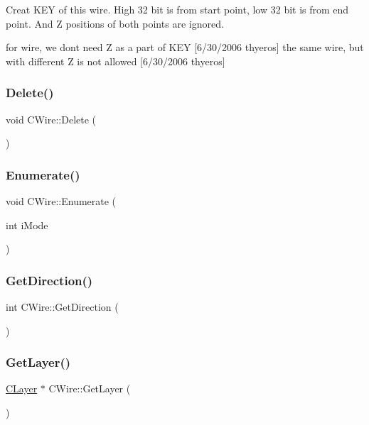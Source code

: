 Creat K\+EY of this wire. High 32 bit is from start point, low 32 bit is from end point. And Z positions of both points are ignored.

for wire, we don\textquotesingle{}t need Z as a part of K\+EY \mbox{[}6/30/2006 thyeros\mbox{]} the same wire, but with different Z is not allowed \mbox{[}6/30/2006 thyeros\mbox{]} \mbox{\label{classCWire_abbcbc22230d8e5a87ac4de9cbf990022}} 
\subsubsection{\texorpdfstring{Delete()}{Delete()}}
{\footnotesize\ttfamily void C\+Wire\+::\+Delete (\begin{DoxyParamCaption}{ }\end{DoxyParamCaption})}

\mbox{\label{classCWire_aa9ee88d6fd7117d3029c5a910c7957af}} 
\subsubsection{\texorpdfstring{Enumerate()}{Enumerate()}}
{\footnotesize\ttfamily void C\+Wire\+::\+Enumerate (\begin{DoxyParamCaption}\item[{int}]{i\+Mode }\end{DoxyParamCaption})}

\mbox{\label{classCWire_a737e918e2752d29ef32db9bc4648cb90}} 
\subsubsection{\texorpdfstring{GetDirection()}{GetDirection()}}
{\footnotesize\ttfamily int C\+Wire\+::\+Get\+Direction (\begin{DoxyParamCaption}{ }\end{DoxyParamCaption})}

\mbox{\label{classCWire_a828800be53e43a40999877e9a56f8c20}} 
\subsubsection{\texorpdfstring{GetLayer()}{GetLayer()}}
{\footnotesize\ttfamily \mbox{\hyperlink{classCLayer}{C\+Layer}} $\ast$ C\+Wire\+::\+Get\+Layer (\begin{DoxyParamCaption}{ }\end{DoxyParamCaption})}

